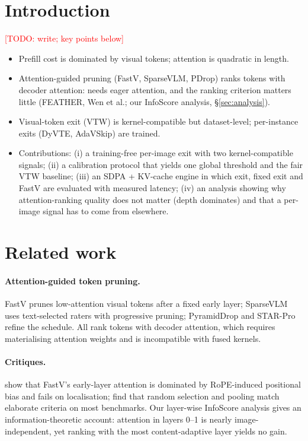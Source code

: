 \documentclass[10pt]{article}
\newcommand{\todo}[1]{\textcolor{red}{[TODO: #1]}}
\begin{document}
\section{Introduction}
\todo{write; key points below}
\begin{itemize}
\item Prefill cost is dominated by visual tokens; attention is quadratic in length.
\item Attention-guided pruning (FastV, SparseVLM, PDrop) ranks tokens with decoder attention: needs eager attention,
  and the ranking criterion matters little (FEATHER, Wen et al.; our InfoScore analysis, \S\ref{sec:analysis}).
\item Visual-token exit (VTW) is kernel-compatible but dataset-level; per-instance exits (DyVTE, AdaVSkip) are trained.
\item Contributions: (i) a training-free per-image exit with two kernel-compatible signals; (ii) a calibration
  protocol that yields one global threshold and the fair VTW baseline; (iii) an SDPA + KV-cache engine in which exit,
  fixed exit and FastV are evaluated with measured latency; (iv) an analysis showing why attention-ranking quality
  does not matter (depth dominates) and that a per-image signal has to come from elsewhere.
\end{itemize}

\section{Related work}
\paragraph{Attention-guided token pruning.} FastV \citep{chen2024fastv} prunes low-attention visual tokens after a
fixed early layer; SparseVLM \citep{zhang2024sparsevlm} uses text-selected raters with progressive pruning; PyramidDrop
and STAR-Pro refine the schedule. All rank tokens with decoder attention, which requires materialising attention
weights and is incompatible with fused kernels.
\paragraph{Critiques.} \citet{endo2025feather} show that FastV's early-layer attention is dominated by RoPE-induced
positional bias and fails on localisation; \citet{wen2025token} find that random selection and pooling match elaborate
criteria on most benchmarks. Our layer-wise InfoScore analysis gives an information-theoretic account: attention in
layers 0--1 is nearly image-independent, yet ranking with the most content-adaptive layer yields no gain.
\end{document}
